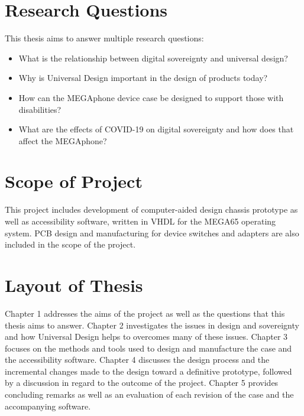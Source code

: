 
\section{Research Questions}

This thesis aims to answer multiple research questions:

\begin{itemize} 
    \item What is the relationship between digital sovereignty and universal design?
    \item Why is Universal Design important in the design of products today?
    \item How can the MEGAphone device case be designed to support those with disabilities?
    \item What are the effects of COVID-19 on digital sovereignty and how does that affect the MEGAphone?
    \end{itemize}


\section{Scope of Project}

This project includes development of computer-aided design chassis prototype as well as accessibility software, written in VHDL for the MEGA65 operating system. 
PCB design and manufacturing for device switches and adapters are also included in the scope of the project.


\section{Layout of Thesis}

Chapter 1 addresses the aims of the project as well as the questions that this thesis aims to answer. 
Chapter 2 investigates the issues in design and sovereignty and how Universal Design helps to overcomes many of these issues. 
Chapter 3 focuses on the methods and tools used to design and manufacture the case and the accessibility software. 
Chapter 4 discusses the design process and the incremental changes made to the design toward a definitive prototype, followed by a discussion in regard to the outcome of the project. 
Chapter 5 provides concluding remarks as well as an evaluation of each revision of the case and the accompanying software.